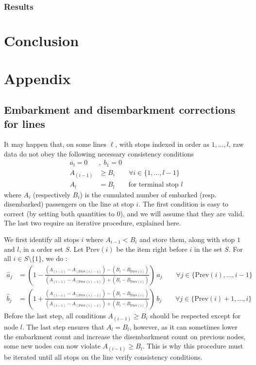 \documentclass{bmcart}
\begin{document}
\subsubsection{Results}
\label{lausanne_results}



\section{Conclusion}



  
\newpage


\section*{Appendix}

\subsection*{Embarkment and disembarkment corrections for lines}
\label{flow_correction}
It may happen that, on some lines $\ell$, with stops indexed in order as $1, \ldots, l$, raw data do not obey the following necessary consistency conditions 
\begin{align*}
	a_l = 0&, \; b_1 = 0 \\
	A_{(i-1)} &\geq B_i \qquad \forall i \in \{1, \ldots, l-1\} \\
	A_{l} &= B_{l} \qquad \text{for terminal stop $l$}
\end{align*}
where $A_i$ (respectively $B_i$) is the cumulated number of embarked (resp. disembarked) passengers on the line at stop $i$. The first condition is easy to correct (by setting both quantities to $0$), and we will assume that they are valid. The last two require an iterative procedure, explained here.

We first identify all stops $i$ where $A_{i - 1} < B_i$ and store them, along with stop $1$ and $l$, in a order set $S$. Let $\text{Prev}(i)$ be the item right before $i$ in the set $S$. For all $i \in S \setminus \{1\}$, we do :
\begin{align*}
		\hat{a}_j&=\left( 1-\frac{(A_{(i-1)} - A_{(\text{Prev}(i)-1)}) - (B_{i} -  B_{\text{Prev}(i)})}{(A_{(i-1)} - A_{(\text{Prev}(i)-1)}) + (B_{i} -  B_{\text{Prev}(i)})}\right)\, a_j  \qquad \forall j \in \{ \text{Prev}(i), \ldots, i-1 \} \\
	\hat{b}_j&=\left( 1+\frac{(A_{(i-1)} - A_{(\text{Prev}(i)-1)}) - (B_{i} -  B_{\text{Prev}(i)})}{(A_{(i-1)} - A_{(\text{Prev}(i)-1)}) + (B_{i} -  B_{\text{Prev}(i)})}\right)\, b_j  \qquad \forall j \in \{ \text{Prev}(i) + 1, \ldots, i \}
\end{align*}
Before the last step, all conditions $A_{(i-1)} \geq  B_{i}$ should be respected except for node $l$. The last step ensures that $A_{l} = B_{l}$, however, as it can sometimes lower the embarkment count and increase the disembarkment count on previous nodes, some new nodes can now violate $A_{(i-1)} \geq B_i$. This is why this procedure must be iterated until all stops on the line verify consistency conditions. 
\end{document}
